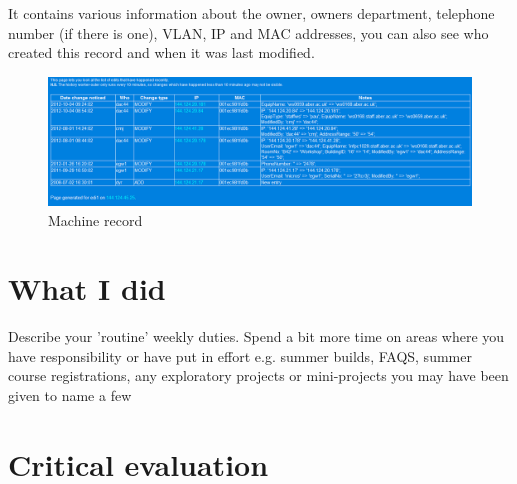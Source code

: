 \documentclass[10pt,a4paper,headinclude=true]{report}
\begin{document}
It contains various information about the owner, owners department, telephone number (if there is one), VLAN, IP and MAC addresses, you can also see who created this record and when it was last modified.

\begin{figure}[H]
\centering
\centerline{\includegraphics[scale=0.5]{./modification_history}}
\caption{Machine record}
\label{fig:modification_history}
\end{figure}


\chapter{What I did}
Describe your 'routine' weekly duties. Spend a bit more time on areas where you have
responsibility or have put in effort e.g. summer builds, FAQS, summer course
registrations, any exploratory projects or mini-projects you may have been given to
name a few

\chapter{Critical evaluation}
\end{document}
